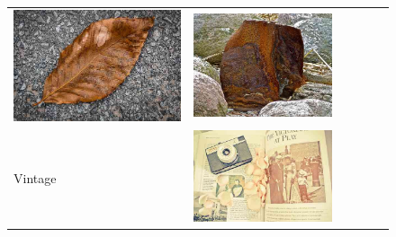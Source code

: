 \begin{figure}
\begin{tabular}{m{.01\linewidth} m{.16\linewidth} m{.16\linewidth} m{.16\linewidth} m{.16\linewidth} m{.16\linewidth}}
    \includegraphics[width=\linewidth]{../style/figures/flickr_on_flickr/pred_style_Texture/3.jpg} &
    \includegraphics[width=\linewidth]{../style/figures/flickr_on_flickr/pred_style_Texture/4.jpg} \\
    \begin{turn}{90}{Vintage}\end{turn} &
    \includegraphics[width=\linewidth]{../style/figures/flickr_on_flickr/pred_style_Vintage/0.jpg} &

\end{tabular}
\end{figure}
